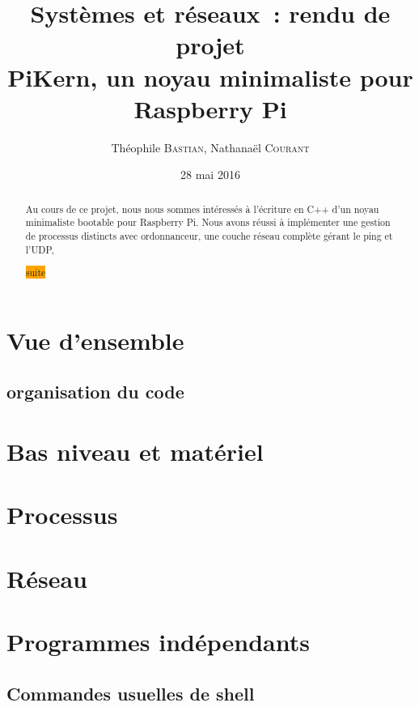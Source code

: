 \documentclass[11pt,a4paper]{article}
\author{Théophile \textsc{Bastian}, Nathanaël \textsc{Courant}}
\title{Systèmes et réseaux~: rendu de projet\\
{\small PiKern, un noyau minimaliste pour Raspberry Pi}}
\date{28 mai 2016}
\newcommand{\todo}[1]{\colorbox{orange}{\color{blue}{\Large TODO:} #1}}
\begin{document}
\maketitle

\begin{abstract}
Au cours de ce projet, nous nous sommes intéressés à l'écriture en C++ d'un
noyau minimaliste bootable pour Raspberry Pi. Nous avons réussi à implémenter
une gestion de processus distincts avec ordonnanceur, une couche réseau
complète gérant le ping et l'UDP,

	\todo{suite}
\end{abstract}

\tableofcontents
\newpage

\section{Vue d'ensemble}

\subsection{organisation du code}

\section{Bas niveau et matériel}

\section{Processus}

\section{Réseau}

\section{Programmes indépendants}

\subsection{Commandes usuelles de shell}
\end{document}
